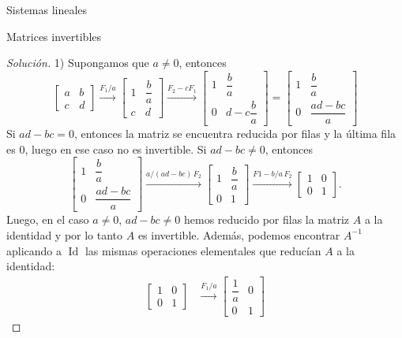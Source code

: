 \documentclass[a4paper,12pt,twoside,spanish,reqno]{amsbook}
\numberwithin{equation}{section}
\theoremstyle{definition}
\theoremstyle{remark}
\newcommand{\Id}{\operatorname{Id}}
\begin{document}
\begin{chapter}{Sistemas lineales}
\begin{section}{Matrices invertibles}
\begin{proof}[Solución]
                1) Supongamos que  $a\not=0$, entonces 
                \begin{equation*}
                \begin{bmatrix}a&b\\c&d\end{bmatrix} \stackrel{F_1/a}{\longrightarrow}
                \begin{bmatrix}1&\dfrac{b}{a}\\[6pt]c&d\end{bmatrix} \stackrel{F_2 -cF_1}{\longrightarrow}
                \begin{bmatrix}1&\dfrac{b}{a}\\[6pt]0&d- c\dfrac{b}{a}\end{bmatrix} =
                \begin{bmatrix}1&\dfrac{b}{a}\\[6pt]0&\dfrac{ad-bc}{a}\end{bmatrix}
                \end{equation*}   
                Si $ad-bc=0$,  entonces la matriz se encuentra reducida por filas y la última fila es $0$, luego en ese caso no es invertible.  Si $ad-bc\not=0$, entonces
                \begin{equation*}
                \begin{bmatrix}1&\dfrac{b}{a}\\[8pt]0&\dfrac{ad-bc}{a}\end{bmatrix} \stackrel{a/(ad-bc)\,F_2}{\longrightarrow}
                \begin{bmatrix}1&\dfrac{b}{a}\\[6pt]0&1\end{bmatrix}
                \stackrel{F1-b/a\,F_2}{\longrightarrow}
                \begin{bmatrix}1&0\\0&1\end{bmatrix}.
                \end{equation*} 
                Luego, en el caso $a\not=0$, $ad-bc\not=0$ hemos reducido por filas la matriz $A$  a la identidad y por lo tanto $A$  es invertible. Además, podemos encontrar $A^{-1}$ aplicando a $\Id$ las mismas operaciones elementales que reducían $A$ a la identidad:
                \begin{align*}
                \begin{bmatrix}1&0\\0&1\end{bmatrix} 
                &\stackrel{F_1/a}{\longrightarrow}
                \begin{bmatrix}\dfrac1a&0\\[8pt]0&1\end{bmatrix} 

\end{align*}
\end{proof}
\end{section}
\end{chapter}
\end{document}
